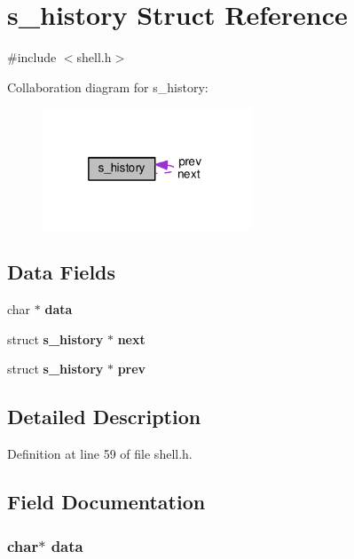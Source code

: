 \section{s\-\_\-history Struct Reference}
\label{structs__history}


{\ttfamily \#include $<$shell.\-h$>$}



Collaboration diagram for s\-\_\-history\-:\nopagebreak
\begin{figure}[H]
\begin{center}
\leavevmode
\includegraphics[width=176pt]{structs__history__coll__graph}
\end{center}
\end{figure}
\subsection*{Data Fields}
\begin{DoxyCompactItemize}
\item 
char $\ast$ {\bf data}
\item 
struct {\bf s\-\_\-history} $\ast$ {\bf next}
\item 
struct {\bf s\-\_\-history} $\ast$ {\bf prev}
\end{DoxyCompactItemize}


\subsection{Detailed Description}


Definition at line 59 of file shell.\-h.



\subsection{Field Documentation}
\subsubsection[{data}]{\setlength{\rightskip}{0pt plus 5cm}char$\ast$ data}\label{structs__history_a91a70b77df95bd8b0830b49a094c2acb}


